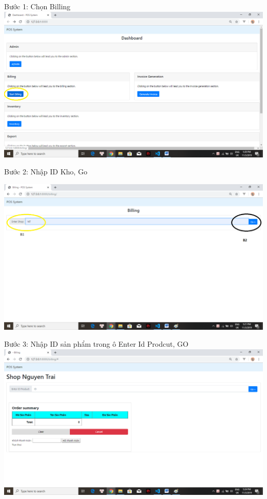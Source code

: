 \documentclass{article}
\begin{document}
\pagebreak


Bước 1: Chọn Billing\\

\includegraphics[scale = 0.4]{23.png}

Bước 2: Nhập ID Kho, Go

\includegraphics[scale = 1]{24.png}

\pagebreak

Bước 3: Nhập ID sản phẩm trong ô Enter Id Prodcut, GO \\

\includegraphics[scale=0.5]{25.png}
\end{document}
